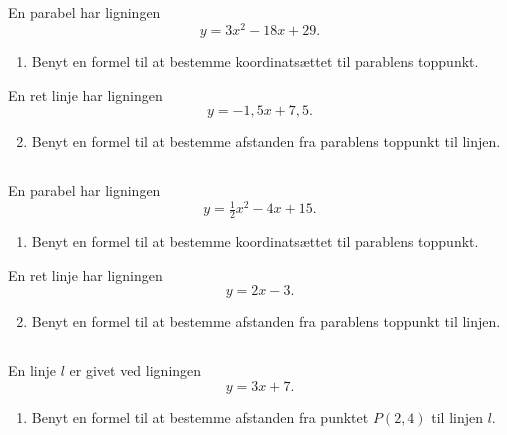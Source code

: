 \documentclass[10pt,a4paper,table]{article}
\begin{document}
\subsection{}
En parabel har ligningen
\[
    y = 3x^2 - 18x + 29 .
\]

\begin{enumerate}
    \item Benyt en formel til at bestemme koordinats\ae{}ttet til parablens toppunkt.
\end{enumerate}

En ret linje har ligningen
\[
    y = -1{,}5x + 7{,}5 .
\]

\begin{enumerate}
    \setcounter{enumi}{1}
    \item Benyt en formel til at bestemme afstanden fra parablens toppunkt til linjen.
\end{enumerate}

\subsection{}
En parabel har ligningen
\[
    y = \tfrac{1}{2}x^2 - 4x + 15 .
\]

\begin{enumerate}
    \item Benyt en formel til at bestemme koordinats\ae{}ttet til parablens toppunkt.
\end{enumerate}

En ret linje har ligningen
\[
    y = 2x - 3 .
\]

\begin{enumerate}
    \setcounter{enumi}{1}
    \item Benyt en formel til at bestemme afstanden fra parablens toppunkt til linjen.
\end{enumerate}

\subsection{}
En linje $l$ er givet ved ligningen
\[
    y = 3x + 7 .
\]

\begin{enumerate}
    \item Benyt en formel til at bestemme afstanden fra punktet $P(2,4)$ til linjen $l$.
\end{enumerate}
\end{document}
